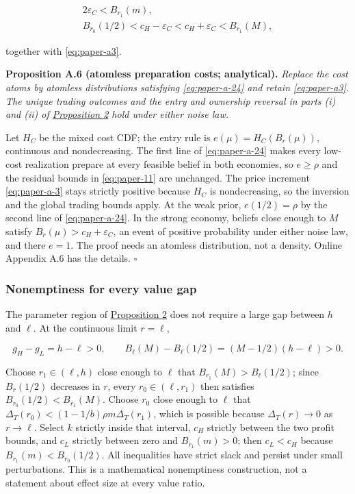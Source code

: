 \documentclass[
  12pt,
]{article}
\begin{document}
\[
\begin{gathered}
2\varepsilon_C<B_{r_1}(m),\\
B_{r_0}(1/2)<c_H-\varepsilon_C<c_H+\varepsilon_C<B_{r_1}(M),
\end{gathered}
\tag{A.24}\label{eq:paper-a-24}
\]

together with \eqref{eq:paper-a3}.


\protect{}\label{result-proposition-a-6}{\textbf{Proposition
A.6 (atomless preparation costs; analytical).}} \emph{Replace the cost
atoms by atomless distributions satisfying \eqref{eq:paper-a-24} and
retain \eqref{eq:paper-a3}. The unique trading outcomes and the entry
and ownership reversal in parts (i) and (ii) of
\hyperref[result-proposition-2]{Proposition 2} hold under either noise
law.}

Let \(H_C\) be the mixed cost CDF; the entry rule is
\(e(\mu)=H_C(B_r(\mu))\), continuous and nondecreasing. The first line
of \eqref{eq:paper-a-24} makes every low-cost realization prepare at
every feasible belief in both economies, so \(e\ge\rho\) and the
residual bounds in \eqref{eq:paper-11} are unchanged. The price
increment \eqref{eq:paper-a-3} stays strictly positive because \(H_C\)
is nondecreasing, so the inversion and the global trading bounds apply.
At the weak prior, \(e(1/2)=\rho\) by the second line of
\eqref{eq:paper-a-24}. In the strong economy, beliefs close enough to
\(M\) satisfy \(B_r(\mu)>c_H+\varepsilon_C\), an event of positive
probability under either noise law, and there \(e=1\). The proof needs
an atomless distribution, not a density. Online Appendix A.6 has the
details. \(\square\)

\subsubsection{Nonemptiness for every value
gap}\label{nonemptiness-for-every-value-gap}

The parameter region of \hyperref[result-proposition-2]{Proposition 2}
does not require a large gap between \(h\) and \(\ell\). At the
continuous limit \(r=\ell\),

\[
g_H-g_L=h-\ell>0,\qquad
B_\ell(M)-B_\ell(1/2)=(M-1/2)(h-\ell)>0.
\tag{A.25}\label{eq:paper-a-25}
\]

Choose \(r_1\in(\ell,h)\) close enough to \(\ell\) that
\(B_{r_1}(M)>B_\ell(1/2)\); since \(B_r(1/2)\) decreases in \(r\), every
\(r_0\in(\ell,r_1)\) then satisfies \(B_{r_0}(1/2)<B_{r_1}(M)\). Choose
\(r_0\) close enough to \(\ell\) that
\(\Delta_T(r_0)<(1-1/b)\rho m\Delta_T(r_1)\), which is possible because
\(\Delta_T(r)\to0\) as \(r\to\ell\). Select \(k\) strictly inside that
interval, \(c_H\) strictly between the two profit bounds, and \(c_L\)
strictly between zero and \(B_{r_1}(m)>0\); then \(c_L<c_H\) because
\(B_{r_1}(m)<B_{r_0}(1/2)\). All inequalities have strict slack and
persist under small perturbations. This is a mathematical nonemptiness
construction, not a statement about effect size at every value ratio.
\end{document}
